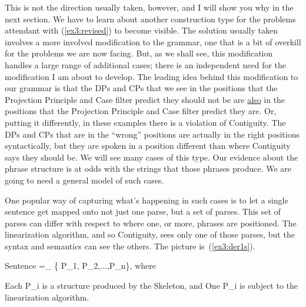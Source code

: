 This is not the direction usually taken, however, and I will show you why in the next section. We have to learn about another construction type for the problems attendant with (\ref{ex3:revised}) to become visible. The solution usually taken involves a more involved modification to the grammar, one that is a bit of overkill for the problems we are now facing. But, as we shall see, this modification handles a large range of additional cases; there is an independent need for the modification I am about to develop. The leading idea behind this modification to our grammar is that the DPs and CPs that we see in the positions that the Projection Principle and Case filter predict they should not be are \underline{also} in the positions that the Projection Principle and Case filter predict they are. Or, putting it differently, in these examples there is a violation of Contiguity. The DPs and CPs that are in the ``wrong'' positions are actually in the right positions syntactically, but they are spoken in a position different than where Contiguity says they should be. We will see many cases of this type. Our evidence about the phrase structure is at odds with the strings that those phrases produce. We are going to need a general model of such cases.

One popular way of capturing what's happening in such cases is to let a single sentence get mapped onto not just one parse, but a set of parses. This set of parses can differ with respect to where one, or more, phrases are positioned. The linearization algorithm, and so Contiguity, sees only one of those parses, but the syntax and semantics can see the others. The picture is~(\ref{ex3:der1s}).
\begin{exe}
	\raggedright
	\ex \label{ex3:der1s} 
	Sentence =_{} \{ P_1, P_2,$\ldots$,P_n\}, where
	\begin{xlist}
		\ex Each P_i is a structure produced by the  Skeleton, and
		\ex One P_i is subject to the linearization algorithm.
	\end{xlist}
\end{exe}

